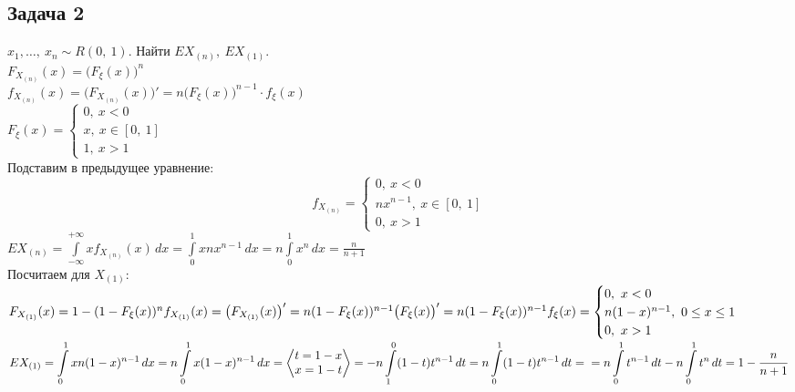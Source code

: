 \documentclass[12pt, a4paper]{article}
\begin{document}
\subsection*{Задача 2}
$x_1,\dots,\ x_n \sim R(0,\ 1)$. Найти $EX_{(n)},\ EX_{(1)}$.\\
$F_{X_{(n)}}(x) = \big( F_{\xi}(x) \big)^n$\\
$f_{X_{(n)}}(x) = \big( F_{X_{(n)}}(x) \big)' = n\big(F_{\xi}(x)\big)^{n - 1}\cdot f_{\xi}(x)$\\
$F_{\xi}(x) = \begin{cases}
    0,\ x < 0\\
    x,\ x\in [0,\ 1]\\
    1,\ x > 1
\end{cases}$\\
Подставим в предыдущее уравнение:
\[f_{X_{(n)}} = \begin{cases}
    0,\ x < 0\\
    nx^{n - 1},\ x\in [0,\ 1]\\
    0,\ x > 1
\end{cases}\]
$EX_{(n)} = \displaystyle\int\limits_{-\infty}^{+\infty} xf_{X_{(n)}}(x)\, dx = \int\limits_0^1 xnx^{n - 1}\, dx = n\int\limits_0^1 x^n\, dx = \frac{n}{n + 1}$\\
Посчитаем для $X_{(1)}$:\\
$F_{X_{(1)}}(x) = 1 - (1 - F_{\xi}(x))^n\\
f_{X_{(1)}}(x) = \big(F_{X_{(1)}}(x)\big)' = n(1 - F_{\xi}(x))^{n - 1} \big(F_{\xi}(x)\big)' = n(1 - F_{\xi}(x))^{n - 1} f_{\xi}(x) = \begin{cases}
    0,\ x < 0\\
    n(1 - x)^{n - 1},\ 0 \leq x \leq 1\\
    0,\ x > 1
\end{cases}$\\
$EX_{(1)} = \displaystyle \int\limits_0^1 xn(1 - x)^{n - 1}\, dx = n\int\limits_0^1 x(1 - x)^{n - 1}\, dx = \left< \begin{matrix}
    t = 1 - x\\
    x = 1 - t
\end{matrix}\right> = -n\int\limits_1^0 (1 - t)t^{n - 1}\, dt = n\int\limits_0^1(1 - t)t^{n - 1}\, dt =\\
= n\int\limits_0^1 t^{n - 1}\, dt - n\int\limits_0^1 t^{n}\, dt = 1 - \frac{n}{n + 1}$
\end{document}
